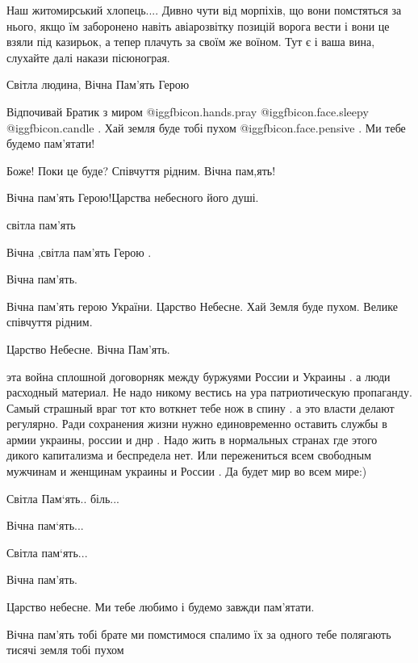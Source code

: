 \begin{itemize}

Наш житомирський хлопець.... Дивно чути від морпіхів, що вони помстяться за
нього, якщо їм заборонено навіть авіарозвітку позицій ворога вести і вони це
взяли під казирьок, а тепер плачуть за своїм же воїном. Тут є і ваша вина,
слухайте далі накази пісюнограя.


Світла людина, Вічна Пам'ять Герою


Відпочивай Братик з миром @igg{fbicon.hands.pray}  @igg{fbicon.face.sleepy}  @igg{fbicon.candle} . Хай
земля буде тобі пухом @igg{fbicon.face.pensive} . Ми тебе будемо пам'ятати!

Боже! Поки це буде? Співчуття рідним. Вічна пам,ять!

Вічна пам'ять Герою!Царства небесного його душі.

світла пам'ять

Вічна ,світла пам'ять Герою .

Вічна пам'ять.

Вічна пам'ять герою України. Царство Небесне. Хай Земля буде пухом. Велике співчуття рідним.

Царство Небесне. Вічна Пам'ять.


эта война сплошной договорняк между буржуями России и Украины . а люди
расходный материал. Не надо никому вестись на ура патриотическую пропаганду.
Самый страшный враг тот кто воткнет тебе нож в спину . а это власти делают
регулярно. Ради сохранения жизни нужно единовременно оставить службы в армии
украины, россии и днр . Надо жить в нормальных странах где этого дикого
капитализма и беспредела нет. Или пережениться всем свободным мужчинам и
женщинам украины и России . Да будет мир во всем мире:)


Світла Пам‘ять.. біль...

Вічна пам‘ять...

Світла пам‘ять...

Вічна пам'ять.

Царство небесне. Ми тебе любимо і будемо завжди пам'ятати.

Вічна пам'ять тобі брате ми помстимося спалимо їх за одного тебе полягають тисячі земля тобі пухом


\end{itemize}
